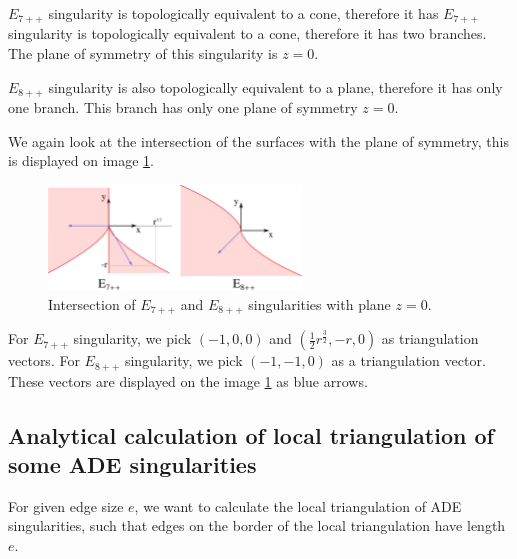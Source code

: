$E_{7++}$ singularity is topologically equivalent to a cone, therefore it has
$E_{7++}$ singularity is topologically equivalent to a cone, therefore it has
two branches. The plane of symmetry of this singularity is $z=0$.

$E_{8++}$ singularity is also topologically equivalent to a plane, therefore
it has only one branch. This branch has only one plane of symmetry $z=0$.

We again look at the intersection of the surfaces with the plane of 
symmetry, this is displayed on image \ref{img:10}.

\begin{figure}
    \centerline{\includegraphics[width=0.6\textwidth]{images/img10}}
    \caption[Intersection of $E_{7++}$ and $E_{8++}$ singularities with 
    plane $z=0$.]
    {Intersection of $E_{7++}$ and $E_{8++}$ singularities with 
    plane $z=0$.}
    \label{img:10}
\end{figure}

For $E_{7++}$ singularity, we pick $(-1, 0, 0)$ and 
$(\frac{1}{2}r^{\frac{3}{2}}, -r, 0)$ as triangulation vectors.
For $E_{8++}$ singularity, we pick $(-1, -1, 0)$ as a triangulation vector.
These vectors are displayed on the image \ref{img:10} as blue arrows.

\subsection*{Analytical calculation of local triangulation of some ADE singularities}
For given edge size $e$, we want to calculate the local triangulation of ADE
singularities, such that edges on the border of the local triangulation
have length $e$.
